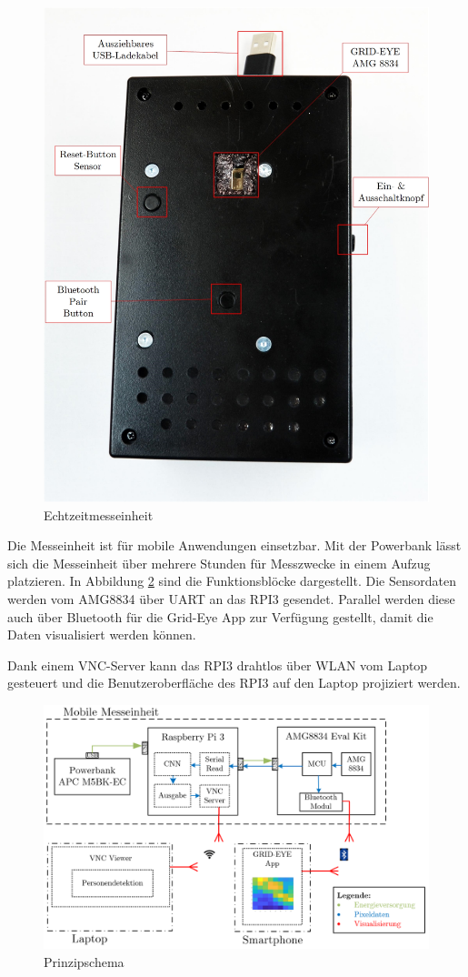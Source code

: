 \begin{figure}[H]
	\centering
	\includegraphics[width=0.8\linewidth]{fig/Echtzeitmessgeraet.jpg}
	\caption[Echtzeitmesseinheit]{Echtzeitmesseinheit}
	\label{fig:einheit1}
\end{figure}

Die Messeinheit ist für mobile Anwendungen einsetzbar. Mit der Powerbank lässt sich die Messeinheit über mehrere Stunden für Messzwecke in einem Aufzug platzieren. In Abbildung \ref{fig:einheit2}  sind die Funktionsblöcke dargestellt. Die Sensordaten werden vom AMG8834 über \ac{UART} an das \ac{RPI3} gesendet. Parallel werden diese auch über Bluetooth für die Grid-Eye App zur Verfügung gestellt, damit die Daten visualisiert werden können.

Dank einem \ac{VNC}-Server kann das \ac{RPI3} drahtlos über WLAN vom Laptop gesteuert und die Benutzeroberfläche des \ac{RPI3} auf den Laptop projiziert werden. 

\begin{figure}[H]
	\centering
	\includegraphics[width=0.9\linewidth]{fig/Messeinheit.png}
	\caption{Prinzipschema}
	\label{fig:einheit2}
\end{figure}

